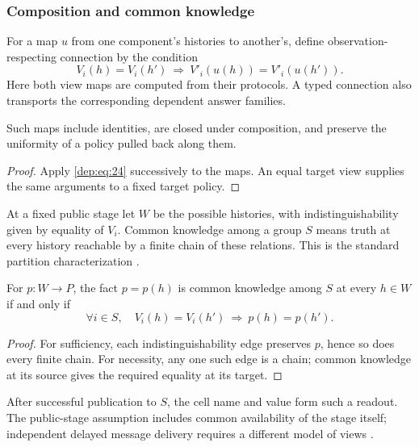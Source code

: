 \subsubsection{Composition and common knowledge}

For a map $u$ from one component's histories to another's, define
observation-respecting connection by the condition
\begin{equation}
 V_i(h)=V_i(h')\ \Longrightarrow\
 V'_i(u(h))=V'_i(u(h')).
 \label{dep:eq:24}
\end{equation}
Here both view maps are computed from their protocols. A typed connection
also transports the corresponding dependent answer families.

\begin{lemma}
\label{lem:view-composition}
Such maps include identities, are closed under composition, and preserve
the uniformity of a policy pulled back along them.
\end{lemma}
\begin{proof}
Apply \eqref{dep:eq:24} successively to the maps. An equal target view supplies the same
arguments to a fixed target policy.
\end{proof}

At a fixed public stage let $W$ be the possible histories, with
indistinguishability given by equality of $V_i$. Common knowledge among a
group $S$ means truth at every history reachable by a finite chain of these
relations. This is the standard partition characterization
\cite{Aumann1976,HalpernMoses1990}.

\begin{lemma}
\label{thm:common-knowledge}
For $p:W\to P$, the fact $p=p(h)$ is common knowledge among $S$ at every
$h\in W$ if and only if
\begin{equation}
 \forall i\in S,\quad
 V_i(h)=V_i(h')\ \Longrightarrow\ p(h)=p(h').
 \label{dep:eq:25}
\end{equation}
\end{lemma}
\begin{proof}
For sufficiency, each indistinguishability edge preserves $p$, hence so
does every finite chain. For necessity, any one such edge is a chain;
common knowledge at its source gives the required equality at its target.
\end{proof}

After successful publication to $S$, the cell name and value form such a
readout. The public-stage assumption includes common availability of the
stage itself; independent delayed message delivery requires a different
model of views \cite{HalpernMoses1990,BaltagMossSolecki1999}.

